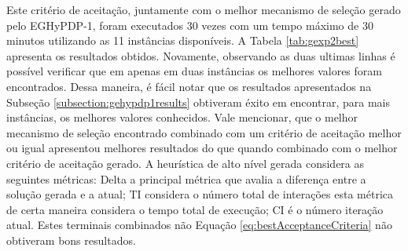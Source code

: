	Este critério de aceitação, juntamente com o melhor mecanismo de seleção gerado pelo EGHyPDP-1, foram executados 30 vezes com um tempo máximo de 30 minutos utilizando as 11 instâncias disponíveis. A Tabela \ref{tab:gexp2best}  apresenta os resultados obtidos. Novamente, observando as duas ultimas linhas é possível verificar que em apenas em duas instâncias os melhores valores foram encontrados. Dessa maneira, é fácil notar que os resultados apresentados na Subseção \ref{subsection:gehypdp1results} obtiveram éxito em encontrar, para mais instâncias,  os melhores valores conhecidos. Vale mencionar, que o melhor mecanismo de seleção encontrado combinado com um critério de aceitação melhor ou igual apresentou melhores resultados do que quando combinado com o melhor critério de aceitação gerado. A heurística de alto nível gerada considera as seguintes métricas: Delta a principal métrica que avalia a diferença entre a solução gerada e a atual; TI considera o número total de interações esta métrica de certa maneira considera o tempo total de execução; CI é o número iteração atual. Estes terminais combinados não Equação \ref{eq:bestAcceptanceCriteria} não obtiveram bons resultados.


	
	\begin{table}[]
		\centering
		\caption{Resultados de 30 execuções do melhor indivíduo encontrado no grupo de experimento EGHyPDP-2}
		\label{tab:gexp2best}
	\end{table}
	
